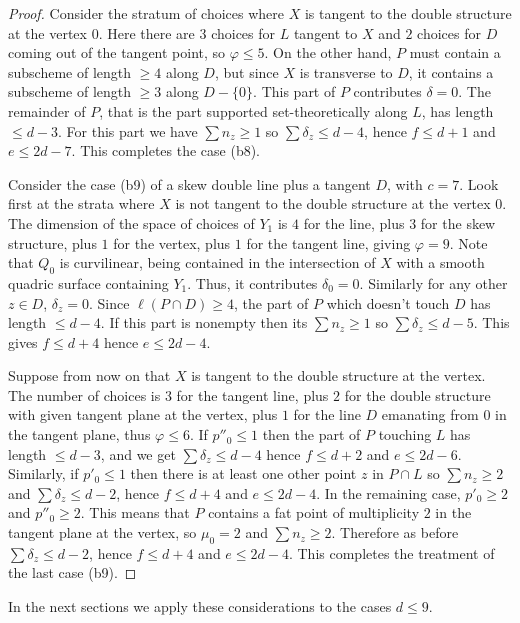 \documentclass{amsart}
\theoremstyle{plain}
\numberwithin{equation}{section}
\begin{document}
\begin{proof}
Consider the stratum of choices where $X$ is tangent to the double structure at
the vertex $0$. Here there are $3$ choices for $L$ tangent to $X$ and $2$ choices
for $D$ coming out of the tangent point, so $\varphi \leq 5$. On the other hand,
$P$ must contain a subscheme of length $\geq 4$ along $D$, but since
$X$ is transverse to $D$, it contains a subscheme of length $\geq 3$ along
$D-\{ 0\}$. This part of $P$ contributes $\delta =0$. The remainder of $P$,
that is the part supported set-theoretically along $L$, has length $\leq d-3$.
For this part we have $\sum n_z\geq 1$ so 
$\sum \delta _z\leq d-4$, hence $f\leq d+1$ and $e\leq 2d-7$.
This completes the case (b8). 

Consider the case (b9) of a skew double line plus a tangent $D$, with $c=7$. 
Look first at the strata where $X$ is not tangent to the double
structure at the vertex $0$. The dimension of the space of choices of $Y_1$ is
$4$ for the line, plus $3$ for the skew structure, plus $1$ for the vertex, plus 
$1$ for the tangent line, giving $\varphi = 9$. 
Note that $Q_0$ is curvilinear, 
being contained in the intersection of $X$ with a smooth quadric surface containing $Y_1$. 
Thus, it contributes $\delta _0=0$. Similarly for any other $z\in D$, $\delta _z=0$.
Since $\ell (P\cap D)\geq 4$, the part of $P$ which doesn't touch $D$ has length $\leq d-4$.
If this part is nonempty then its $\sum n_z\geq 1$ so $\sum \delta _z\leq d-5$.
This gives $f\leq d+4$ hence  $e\leq 2d-4$. 

Suppose from now on that $X$ is tangent to the double structure at the
vertex. The number of choices is $3$ for  the tangent line, plus $2$ for the
double structure with given tangent plane at the vertex, plus $1$ for the 
line $D$ emanating from $0$ in the tangent plane, thus $\varphi \leq 6$. 
If $p''_0\leq 1$ then the part of $P$ touching $L$ has length $\leq d-3$,
and we get $\sum \delta _z\leq d-4$ hence $f\leq d+2$ and $e\leq 2d-6$. 
Similarly, if $p'_0\leq 1$ then there is at least one other point $z$ in $P\cap L$
so $\sum n_z\geq 2$ and $\sum \delta _z\leq d-2$, hence $f\leq d+4$ and $e\leq 2d-4$.
In the remaining case, 
$p'_0\geq 2$ and $p''_0\geq 2$. This means that $P$ contains a fat point of multiplicity $2$
in the tangent plane at the vertex, so $\mu _0=2$ and $\sum n_z\geq 2$. Therefore
as before $\sum \delta _z\leq d-2$, hence $f\leq d+4$ and $e\leq 2d-4$.
This completes the treatment of the last case (b9). 
\end{proof}

In the next sections we apply these considerations to the cases $d\leq 9$. 
\end{document}
